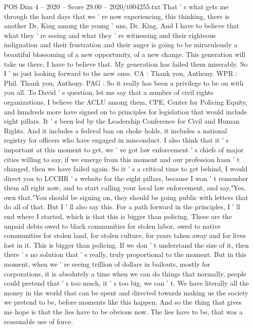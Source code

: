 \begin{textsample}{POS Dim 4 – 2020 – Score 29.00 – 2020/t004255.txt}
That ' s what gets me through the hard days that we ' re now experiencing, this thinking, there is another Dr.
King among the young ' uns, Dr.
King.
And I have to believe that what they ' re seeing and what they ' re witnessing and their righteous indignation and their frustration and their anger is going to be miraculously a beautiful blossoming of a new opportunity, of a new change.
This generation will take us there, I have to believe that.
My generation has failed them miserably.
So I ' m just looking forward to the new ones.
CA : Thank you, Anthony.
WPR : Phil.
Thank you, Anthony.
PAG : So it really has been a privilege to be on with you all.
To David ' s question, let me say that a number of civil rights organizations, I believe the ACLU among them, CPE, Center for Policing Equity, and hundreds more have signed on to principles for legislation that would include eight pillars.
It ' s been led by the Leadership Conference for Civil and Human Rights.
And it includes a federal ban on choke holds, it includes a national registry for officers who have engaged in misconduct.
I also think that it ' s important at this moment to get, we ' ve got law enforcement ' s chiefs of major cities willing to say, if we emerge from this moment and our profession hasn ' t changed, then we have failed again.
So it ' s a critical time to get behind, I would direct you to LCCHR ' s website for the eight pillars, because I won ' t remember them all right now, and to start calling your local law enforcement, and say,"Yes, own that."You should be signing on, they should be going public with letters that do all of that.
But I ' ll also say this.
For a path forward in the principles, I ' ll end where I started, which is that this is bigger than policing.
These are the unpaid debts owed to black communities for stolen labor, owed to native communities for stolen land, for stolen culture, for years taken away and for lives lost in it.
This is bigger than policing.
If we don ' t understand the size of it, then there ' s no solution that ' s really, truly proportional to the moment.
But in this moment, when we ' re seeing trillion of dollars in bailouts, mostly for corporations, it is absolutely a time when we can do things that normally, people could pretend that ' s too much, it ' s too big, we can ' t.
We have literally all the money in the world that can be spent and directed towards making us the society we pretend to be, before moments like this happen.
And so the thing that gives me hope is that the lies have to be obvious now.
The lies have to be, that was a reasonable use of force.

\end{textsample}
